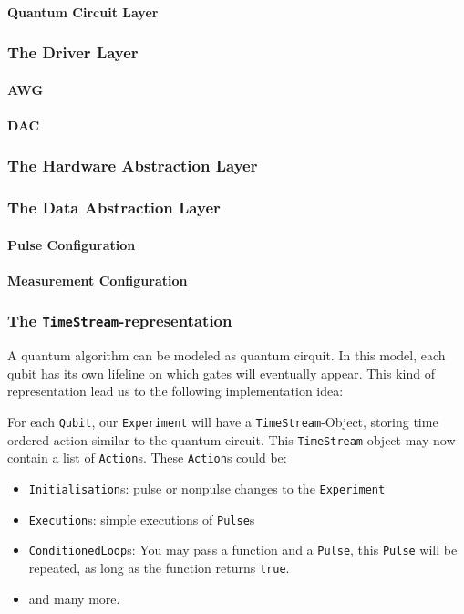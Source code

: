 \documentclass[a4paper,12pt]{article}
\begin{document}
\paragraph{Quantum Circuit Layer}


\subsubsection{The Driver Layer}

\paragraph{AWG}
\paragraph{DAC}

\subsubsection{The Hardware Abstraction Layer}

\subsubsection{The Data Abstraction Layer}

\paragraph{Pulse Configuration}

\paragraph{Measurement Configuration}

\subsubsection{The \texttt{TimeStream}-representation}
A quantum algorithm can be modeled as quantum cirquit. In this model, each qubit has its own lifeline on which gates will eventually appear. This kind of representation lead us to the following implementation idea:

For each \texttt{Qubit}, our \texttt{Experiment} will have a \texttt{TimeStream}-Object, storing time ordered action similar to the quantum circuit. 
This \texttt{TimeStream} object may now contain a list of \texttt{Action}s. These \texttt{Action}s could be:
\begin{itemize} \itemsep-0.5pt
 \item \texttt{Initialisation}s: pulse or nonpulse changes to the \texttt{Experiment}
 \item \texttt{Execution}s: simple executions of \texttt{Pulse}s
 \item \texttt{ConditionedLoop}s: You may pass a function and a \texttt{Pulse}, this \texttt{Pulse} will be repeated, as long as the function returns \texttt{true}.
 \item and many more.
\end{itemize}
\end{document}
